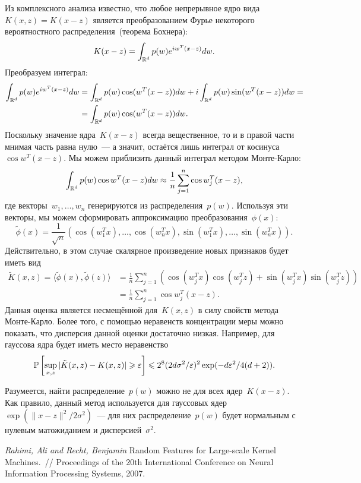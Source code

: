\documentclass[12pt,fleqn]{article}
\begin{document}
Из комплексного анализа известно, что любое непрерывное ядро вида~$K(x, z) = K(x - z)$
является преобразованием Фурье некоторого вероятностного распределения~(теорема Бохнера):
\[
    K(x - z)
    =
    \int_{\mathbb{R}^d}
        p(w)
        e^{i w^T (x - z)}
    dw.
\]
Преобразуем интеграл:
\begin{align*}
    \int_{\mathbb{R}^d}
        p(w)
        e^{i w^T (x - z)}
    dw
    &=
    \int_{\mathbb{R}^d}
        p(w)
        \cos(w^T (x - z))
    dw
    +
    i
    \int_{\mathbb{R}^d}
        p(w)
        \sin(w^T (x - z))
    dw
    =\\
    &=
    \int_{\mathbb{R}^d}
        p(w)
        \cos(w^T (x - z))
    dw.
\end{align*}
Поскольку значение ядра~$K(x - z)$ всегда вещественное,
то и в правой части мнимая часть равна нулю~---
а значит, остаётся лишь интеграл от косинуса~$\cos w^T (x - z)$.
Мы можем приблизить данный интеграл методом Монте-Карло:
\[
    \int_{\mathbb{R}^d}
        p(w)
        \cos w^T (x - z)
    dw
    \approx
    \frac{1}{n}
    \sum_{j = 1}^{n}
        \cos w_j^T (x - z),
\]
где векторы~$w_1, \dots, w_n$ генерируются из распределения~$p(w)$.
Используя эти векторы, мы можем сформировать аппроксимацию преобразования~$\phi(x)$:
\[
    \tilde \phi(x)
    =
    \frac{1}{\sqrt{n}}
    (\cos(w_1^T x), \dots, \cos(w_n^T x),
    \sin(w_1^T x), \dots, \sin(w_n^T x)).
\]
Действительно, в этом случае скалярное произведение новых признаков будет иметь вид
\begin{align*}
    \tilde K(x, z)
    =
    \langle \tilde \phi(x), \tilde \phi(z) \rangle
    &=
    \frac{1}{n}
    \sum_{j = 1}^{n} \left(
        \cos(w_j^T x) \cos(w_j^T z)
        +
        \sin(w_j^T x) \sin(w_j^T z)
    \right)\\
    &=
    \frac{1}{n}
    \sum_{j = 1}^{n}
        \cos w_j^T (x - z).
\end{align*}
Данная оценка является несмещённой для~$K(x, z)$ в силу свойств метода Монте-Карло.
Более того, с помощью неравенств концентрации меры можно показать, что дисперсия данной оценки достаточно низкая.
Например, для гауссова ядра будет иметь место неравенство
\[
    \mathbb{P}
    \left[
        \sup_{x, z}
        | \tilde K(x, z) - K(x, z) |
        \geqslant
        \varepsilon
    \right]
    \leqslant
    2^8
    (2 d \sigma^2 / \varepsilon)^2
    \exp(-d \varepsilon^2 / 4(d + 2)).
\]

Разумеется, найти распределение~$p(w)$ можно не для всех ядер~$K(x - z)$.
Как правило, данный метод используется для гауссовых ядер~$\exp(\|x - z\|^2 / 2 \sigma^2)$~---
для них распределение~$p(w)$ будет нормальным  с нулевым матожиданием и дисперсией~$\sigma^2$.


\begin{thebibliography}{1}
    \emph{Rahimi, Ali and Recht, Benjamin}
    Random Features for Large-scale Kernel Machines.~//
    Proceedings of the 20th International Conference on Neural Information Processing Systems,
    2007.
\end{thebibliography}
\end{document}
